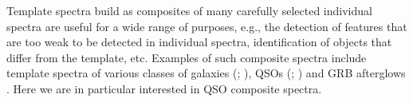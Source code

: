 \documentclass{aa}    %
\newcommand{\sectionname}{Section}
\newcommand{\Sect}[1]{\sectionname~\ref{sect:#1}}
\newcommand{\sect}[1]{\Sect{#1}}
\newcommand{\todo}[3]{{\color{#2}\emph{#1}: #3}}
\newcommand{\jstodo}[1]{\todo{ \\TODO }{red}{#1}}
\newcommand{\qtodo}[1]{\todo{\\ Question}{red}{#1}}
\begin{document}
%
%
%
%
%
%
%
%
%
%
%
%
%
%

Template spectra build as composites of many carefully selected individual spectra
are useful for a wide range of purposes, e.g., the detection
of features that are too weak to be detected in individual spectra,
identification of objects that differ from the template, etc. Examples of such
composite spectra include template spectra of various classes of galaxies
(\cite{Shapley2003}; \cite{Dobos2012}), QSOs (\citep{CristianiS.andVio1990, Boyle1990, Francis1991, Zheng1997, Brotherton2000};
\citep{VandenBerk2001, Telfer2002, Richards2006a, Glikman2006}) and GRB afterglows \citep{Christensen2011}.
Here we are in particular interested in  
QSO composite spectra.
\end{document}
